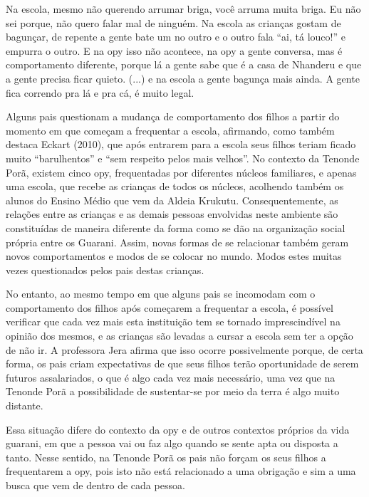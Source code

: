 \documentclass{article}
\begin{document}
Na escola, mesmo n\~ao querendo arrumar briga, voc\^e arruma muita
briga. Eu n\~ao sei porque, n\~ao quero falar mal de ningu\'em. Na
escola as crian\c{c}as gostam de bagun\c{c}ar, de repente a gente bate
um no outro e o outro fala {\textquotedblleft}ai, t\'a
louco!{\textquotedblright} e empurra o outro. E na opy isso n\~ao
acontece, na opy a gente conversa, mas \'e comportamento diferente,
porque l\'a a gente sabe que \'e a casa de Nhanderu e que a gente
precisa ficar quieto. (...) e na escola a gente bagun\c{c}a mais ainda.
A gente fica correndo pra l\'a e pra c\'a, \'e muito legal.

Alguns pais questionam a mudan\c{c}a de comportamento dos filhos a
partir do momento em que come\c{c}am a frequentar a escola, afirmando,
como tamb\'em destaca Eckart (2010), que ap\'os entrarem para a escola
seus filhos teriam ficado muito
{\textquotedblleft}barulhentos{\textquotedblright} e
{\textquotedblleft}sem respeito pelos mais velhos{\textquotedblright}.
No contexto da Tenonde Por\~a, existem cinco opy, frequentadas por
diferentes n\'ucleos familiares, e apenas uma escola, que recebe as
crian\c{c}as de todos os n\'ucleos, acolhendo tamb\'em os alunos do
Ensino M\'edio que vem da Aldeia Krukutu. Consequentemente, as
rela\c{c}\~oes entre as crian\c{c}as e as demais pessoas envolvidas
neste ambiente s\~ao constitu\'idas de maneira diferente da forma como
se d\~ao na organiza\c{c}\~ao social pr\'opria entre os Guarani. Assim,
novas formas de se relacionar tamb\'em geram novos comportamentos e
modos de se colocar no mundo. Modos estes muitas vezes questionados
pelos pais destas crian\c{c}as. 

No entanto, ao mesmo tempo em que alguns pais se incomodam com o
comportamento dos filhos ap\'os come\c{c}arem a frequentar a escola,
\'e poss\'ivel verificar que cada vez mais esta institui\c{c}\~ao tem
se tornado imprescind\'ivel na opini\~ao dos mesmos, e as crian\c{c}as
s\~ao levadas a cursar a escola sem ter a op\c{c}\~ao de n\~ao ir. A
professora Jera afirma que isso ocorre possivelmente porque, de certa
forma, os pais criam expectativas de que seus filhos ter\~ao
oportunidade de serem futuros assalariados, o que \'e algo cada vez
mais necess\'ario, uma vez que na Tenonde Por\~a a possibilidade de
sustentar-se por meio da terra \'e algo muito distante.

Essa situa\c{c}\~ao difere do contexto da opy e de outros contextos
pr\'oprios da vida guarani, em que a pessoa vai ou faz algo quando se
sente apta ou disposta a tanto. Nesse sentido, na Tenonde Por\~a os
pais n\~ao for\c{c}am os seus filhos a frequentarem a opy, pois isto
n\~ao est\'a relacionado a uma obriga\c{c}\~ao e sim a uma busca que
vem de dentro de cada pessoa.
\end{document}
